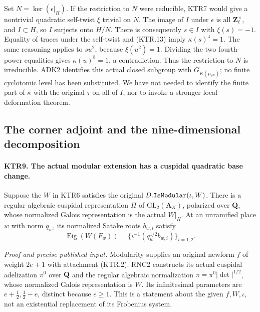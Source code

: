 \documentclass[11pt,a4paper]{article}
\numberwithin{equation}{section}
\theoremstyle{remark}\newtheorem{remark}[theorem]{Remark}
\begin{document}
Set \(N=\ker(\epsilon|_H)\).  If the restriction to \(N\)
were reducible, KTR7 would give a nontrivial quadratic self-twist
\(\xi\) trivial on \(N\).  The image of \(I\) under
\(\epsilon\) is all \(\mathbf Z_\ell^\times\), and
\(I\subset H\), so \(I\) surjects onto \(H/N\).
There is consequently \(s\in I\) with \(\xi(s)=-1\).
Equality of traces under the self-twist and (KTR.13) imply
\(\kappa(s)^4=1\).  The same reasoning applies to
\(su^2\), because \(\xi(u^2)=1\).  Dividing the two
fourth-power equalities gives \(\kappa(u)^8=1\), a
contradiction.  Thus the restriction to \(N\) is irreducible.
ADK2 identifies this actual closed subgroup with
\(G_{K(\mu_{\ell^\infty})}\); no finite cyclotomic level
has been substituted.  We have not needed to identify the finite
part of \(\kappa\) with the original \(\tau\) on all of
\(I\), nor to invoke a stronger local deformation theorem.

\subsection{The corner adjoint and the nine-dimensional decomposition}

\paragraph{KTR9. The actual modular extension has a cuspidal quadratic base change.}
\label{claim:KTR9}
Suppose the \(W\) in KTR6 satisfies the original
\(D.\texttt{Is\allowbreak Modular}(\iota,W)\).  There is a regular
algebraic cuspidal representation \(\Pi\) of
\(\mathrm{GL}_2(\mathbf A_K)\), polarized over \(\mathbf Q\),
whose normalized Galois representation is the actual \(W|_H\).
At an unramified place \(w\) with norm \(q_w\), its
normalized Satake roots \(b_{w,i}\) satisfy
\[
       \operatorname{Eig}(W(F_w))
                  =\{\iota^{-1}(q_w^{1/2}b_{w,i})\}_{i=1,2}.
 \tag{KTR.14}
\]

\emph{Proof and precise published input.}
Modularity supplies an original newform \(f\) of weight
\(2e+1\) with attachment (KTR.2).  RNC2 constructs its actual
cuspidal adelization \(\pi^0\) over \(\mathbf Q\) and
the regular algebraic normalization
\(\pi=\pi^0|\det|^{1/2}\), whose normalized Galois
representation is \(W\).  Its infinitesimal parameters are
\(e+\tfrac12,\tfrac12-e\), distinct because \(e\ge1\).
This is a statement about the given \(f,W,\iota\), not an
existential replacement of its Frobenius system.
\end{document}
